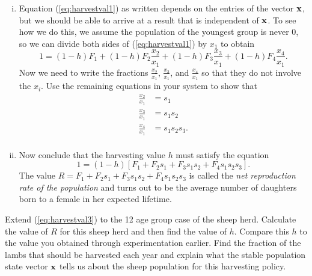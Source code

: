 \begin{pactivity}
\begin{enumerate}[i.]
        \item Equation (\ref{eq:harvestval1}) as written depends on the entries of the vector $\mathbf{x}$, but we should be able to arrive at a result that is independent of $\mathbf{x}$. To see how we do this, we assume the population of the youngest group is never 0, so we can divide both sides of (\ref{eq:harvestval1}) by $x_1$ to obtain
\begin{equation} 
1 = (1-h)F_1 + (1-h)F_2 \frac{x_2}{x_1} + (1-h)F_3 \frac{x_3}{x_1} + (1-h)F_4 \frac{x_4}{x_1}. \label{eq:harvestval2}
\end{equation}
Now we need to write the fractions $\frac{x_2}{x_1}$,   $\frac{x_3}{x_1}$,  and $\frac{x_4}{x_1}$ so that they do not involve the $x_i$. Use the remaining equations in your system to show that
\begin{align*}
\frac{x_2}{x_1} &= s_1 \\
\frac{x_3}{x_1} &= s_1s_2 \\
\frac{x_4}{x_1} &= s_1s_2s_3. \\
\end{align*}


\item Now conclude that the harvesting value $h$ must satisfy the equation
\begin{equation}
1 = (1-h) [F_1 + F_2 s_1 + F_3 s_1s_2 + F_4 s_1s_2s_3]. \label{eq:harvestval3}
\end{equation}
The value $R = F_1 + F_2 s_1 + F_3 s_1s_2 + F_4 s_1s_2s_3$ is called the \emph{net reproduction rate of the population} and turns out to be the average number of daughters born to a female in her expected lifetime.


        \end{enumerate}

\item Extend (\ref{eq:harvestval3}) to the 12 age group case of the sheep herd. Calculate the value of $R$ for this sheep herd and then find the value of $h$. Compare this $h$ to the value you obtained through experimentation earlier. Find the fraction of the lambs that should be harvested each year and explain what the stable population state vector $\mathbf{x}$ tells us about the sheep population for this harvesting policy.


\ea
\end{pactivity}



